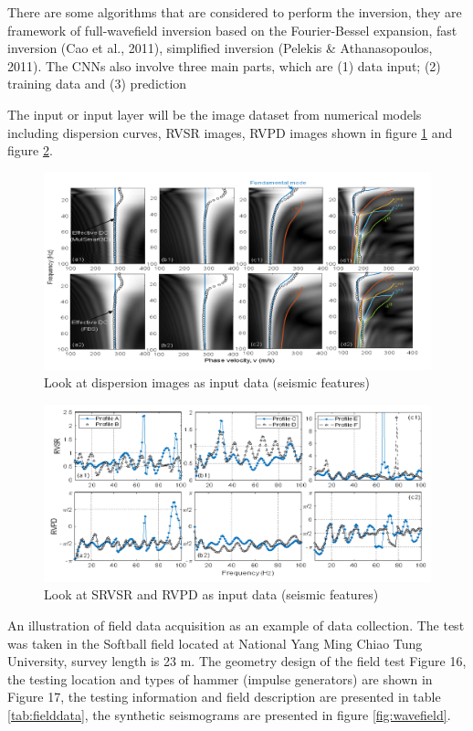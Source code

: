 There are some algorithms that are considered to perform the inversion, they are framework of full-wavefield inversion based on the Fourier-Bessel expansion, fast inversion (Cao et al., 2011), simplified inversion (Pelekis \& Athanasopoulos, 2011). The CNNs also involve three main parts, which are (1) data input; (2) training data and (3) prediction 

The input or input layer will be the image dataset from numerical models including dispersion curves, RVSR images, RVPD images shown in figure \ref{fig:DCinput} and figure \ref{fig:RVSRinput}.


\begin{figure}[!t]
    \centering
    \includegraphics[scale=0.3]{images/DCinput.png}
    \caption{Look at dispersion images as input data (seismic features)}
    \label{fig:DCinput}
\end{figure}


\begin{figure}[!t]
    \centering
    \includegraphics[scale=0.5]{images/RVSRinput.png}
    \caption{Look at SRVSR and RVPD as input data (seismic features)}
    \label{fig:RVSRinput}
\end{figure}

An illustration of field data acquisition as an example of data collection. The test was taken in the Softball field located at National Yang Ming Chiao Tung University, survey length is 23 m. The geometry design of the field test Figure 16, the testing location and types of hammer (impulse generators) are shown in Figure 17, the testing information and field description are presented in table \ref{tab:fielddata}, the synthetic seismograms are presented in figure \ref{fig:wavefield}.

